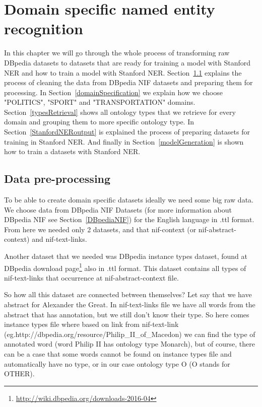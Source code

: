 \documentclass[thesis=M,english]{FITthesis}[2018/05/30]
\begin{document}
\chapter{Domain specific named entity recognition}\label{}
	In this chapter we will go through the whole process of transforming raw DBpedia datasets to datasets that are ready for training a model with Stanford NER and how to train a model with Stanford NER. Section~\ref{dataPreProcessing} explains the process of cleaning the data from DBpedia NIF datasets and preparing them for processing. In Section~\ref{domainSpecification} we explain how we choose "POLITICS", "SPORT" and "TRANSPORTATION" domains. Section~\ref{typesRetrieval} shows all ontology types that we retrieve for every domain and grouping them to more specific ontology type. In Section~\ref{StanfordNERoutput} is explained the process of preparing datasets for training in Stanford NER. And finally in Section~\ref{modelGeneration} is shown how to train a datasets with Stanford NER.  

\section{Data pre-processing}\label{dataPreProcessing}
	To be able to create domain specific datasets ideally we need some big raw data. We choose data from DBpedia NIF Datasets (for more information about DBpedia NIF see Section~\ref{DBpediaNIF}) for the English language in .ttl format. From here we needed only 2 datasets, and that nif-context (or nif-abstract-context) and nif-text-links.

	Another dataset that we needed was DBpedia instance types dataset, found at DBpedia download page\footnote{\url{http://wiki.dbpedia.org/downloads-2016-04}} also in .ttl format. This dataset contains all types of nif-text-links that occurrence at nif-abstract-context file.

	So how all this dataset are connected between themselves? Let say that we have abstract for Alexander the Great. In nif-text-links file we have all words from the abstract that has annotation, but we still don't know their type. So here comes instance types file where based on link from nif-text-link (eg.http://dbpedia.org/resource/Philip\_II\_of\_Macedon) we can find the type of annotated word (word Philip II has ontology type Monarch), but of course, there can be a case that some words cannot be found on instance types file and automatically have no type, or in our case ontology type O (O stands for OTHER).
\end{document}
